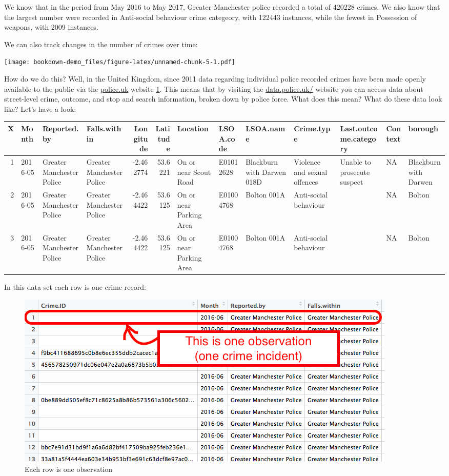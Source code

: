 \documentclass[]{book}
\theoremstyle{definition}
\theoremstyle{definition}
\theoremstyle{definition}
\theoremstyle{remark}
\begin{document}
We know that in the period from May 2016 to May 2017, Greater Manchester
police recorded a total of 420228 crimes. We also know that the largest
number were recorded in Anti-social behaviour crime categeory, with
122443 instances, while the fewest in Possession of weapons, with 2009
instances.

We can also track changes in the number of crimes over time:

\texttt{[image: bookdown-demo\_files/figure-latex/unnamed-chunk-5-1.pdf]}

How do we do this? Well, in the United Kingdom, since 2011 data
regarding individual police recorded crimes have been made openly
available to the public via the \href{http://www.police.uk/}{police.uk}
website
\href{http://www.tandfonline.com/doi/abs/10.1080/15230406.2014.972456}{1}.
This means that by visiting the
\href{https://data.police.uk/}{data.police.uk/} website you can access
data about street-level crime, outcome, and stop and search information,
broken down by police force. What does this mean? What do these data
look like? Let's have a look:

\begin{tabular}{r|l|l|l|r|r|l|l|l|l|l|l|l}
\hline
X & Month & Reported.by & Falls.within & Longitude & Latitude & Location & LSOA.code & LSOA.name & Crime.type & Last.outcome.category & Context & borough\\
\hline
1 & 2016-05 & Greater Manchester Police & Greater Manchester Police & -2.462774 & 53.6221 & On or near Scout Road & E01012628 & Blackburn with Darwen 018D & Violence and sexual offences & Unable to prosecute suspect & NA & Blackburn with Darwen\\
\hline
2 & 2016-05 & Greater Manchester Police & Greater Manchester Police & -2.464422 & 53.6125 & On or near Parking Area & E01004768 & Bolton 001A & Anti-social behaviour &  & NA & Bolton\\
\hline
3 & 2016-05 & Greater Manchester Police & Greater Manchester Police & -2.464422 & 53.6125 & On or near Parking Area & E01004768 & Bolton 001A & Anti-social behaviour &  & NA & Bolton\\
\hline
\end{tabular}

In this data set each row is one crime record:

\begin{figure}
\centering
\includegraphics{imgs/rowIsObservation.png}
\caption{Each row is one observation}
\end{figure}
\end{document}
